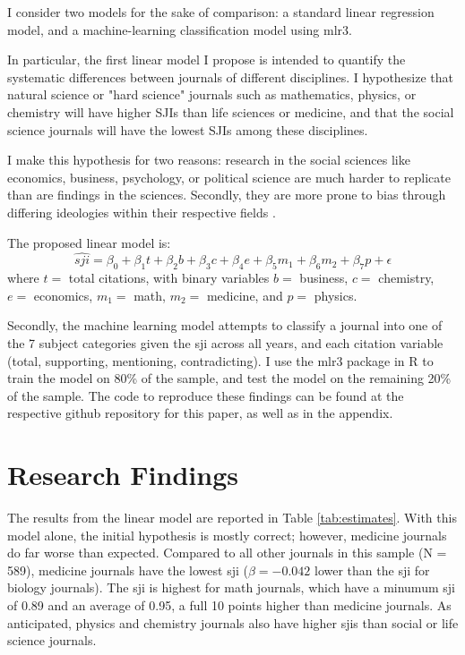 \documentclass[12pt,english]{article}
\begin{document}
I consider two models for the sake of comparison: a standard linear regression model, and a machine-learning classification model using mlr3.

In particular, the first linear model I propose is intended to quantify the systematic differences between journals of different disciplines. I hypothesize that natural science or "hard science" journals such as mathematics, physics, or chemistry will have higher SJIs than life sciences or medicine, and that the social science journals will have the lowest SJIs among these disciplines.

I make this hypothesis for two reasons: research in the social sciences like economics, business, psychology, or political science are much harder to replicate than are findings in the sciences. Secondly, they are more prone to bias through differing ideologies within their respective fields \citep{duyx_scientific_2017}.

The proposed linear model is:
\begin{equation}
    \hat{sji} = \beta_0 + \beta_1 t + \beta_2 b + \beta_3 c + \beta_4 e + \beta_5 m_1 + \beta_6 m_2 + \beta_7 p + \epsilon
\end{equation}
where $t =$ total citations, with binary variables $b =$ business, $c =$ chemistry, $e =$ economics, $m_1 =$ math, $m_2 =$ medicine, and $p =$ physics.

Secondly, the machine learning model attempts to classify a journal into one of the 7 subject categories given the sji across all years, and each citation variable (total, supporting, mentioning, contradicting). I use the mlr3 package in R to train the model on 80\% of the sample, and test the model on the remaining 20\% of the sample. The code to reproduce these findings can be found at the respective github repository for this paper, as well as in the appendix.

\section{Research Findings}\label{sec:results}
The results from the linear model are reported in Table \ref{tab:estimates}. With this model alone, the initial hypothesis is mostly correct; however, medicine journals do far worse than expected. Compared to all other journals in this sample (N = 589), medicine journals have the lowest sji ($\beta = -0.042$ lower than the sji for biology journals). The sji is highest for math journals, which have a minumum sji of 0.89 and an average of 0.95, a full 10 points higher than medicine journals. As anticipated, physics and chemistry journals also have higher sjis than social or life science journals. 
\end{document}
